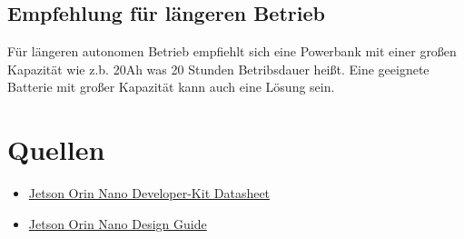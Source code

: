 \documentclass[12pt]{article}
\begin{document}
    \subsection*{Empfehlung für längeren Betrieb}
    
    Für längeren autonomen Betrieb empfiehlt sich eine Powerbank mit einer großen 
    Kapazität wie z.b. 20Ah was 20 Stunden Betribsdauer heißt.
    Eine geeignete Batterie mit großer Kapazität kann auch eine Lösung sein.

\section{Quellen}
\begin{itemize}
    \item \textcolor{blue}{\href{https://developer.download.nvidia.com/assets/embedded/secure/jetson/orin_nano/docs/Jetson-Orin-Nano-DevKit-Carrier-Board-Specification_SP-11324-001_v1.2.pdf?KmgI9RJCufnwzXmxbGPExVQp1r131wrAPSzR9RMDhh83EhjqXKmYVbjwEjUNXPMiO3peL2R_7D_xp9mFQTBkPF-Bon3l72rEZPIiNTVUv5oIjQsvFsQ0pqAZxr16W-12GNU3N596RY1rC1tgxd5_XwyvJRNhcRcOank-v-QwQweH0clhI5Vvdy5dZVF-qYLeuslCScepJxD-v-TAHS2XuNFpJb69-WoTOPi_AyxiG2scwgKnqQ==&t=eyJscyI6IndlYnNpdGUiLCJsc2QiOiJkZXZlbG9wZXIubnZpZGlhLmNvbS9lbWJlZGRlZC9kb3dubG9hZHMjP3NlYXJjaD1EYXRhJTIwU2hlZXRcdTAwMjZ0eD0kcHJvZHVjdCxqZXRzb25fYWd4X29yaW4samV0c29uX29yaW5fbngsamV0c29uX29yaW5fbmFubyJ9}{Jetson Orin Nano Developer-Kit Datasheet}}
    \item \textcolor{blue}{\href{https://developer.download.nvidia.com/assets/embedded/secure/jetson/orin_nx/docs/Jetson_Orin_NX_Series_and_Orin_Nano_Series_Design_Guide_DG-10931-001_v0.99.pdf?-ui8gdVNlYdmaR5WwGz-6xSE6JTrbPKmmiEaqjr9WzfO6o67G4dBKQu1cLXoFzsc2V3V4YrEuGoG5PmGBTp4DMwUibOm-PJI1TdO2lRc9sRcgO2NXf9KLdLphKAuH52nKmnexBGeYp2NIY0mCgF5LX7VctB_s_CeaxlaY_7BUog4ox6tD_iH2ZcG210QVnzdAVQuxdxAKdzFfO5YgnjsWnhPKu6q1_8wzr7B6rrkjGc2l6kfw5vPjg==&t=eyJscyI6IndlYnNpdGUiLCJsc2QiOiJkZXZlbG9wZXIubnZpZGlhLmNvbS9lbWJlZGRlZC9kb3dubG9hZHMjP3NlYXJjaD1EYXRhJTIwU2hlZXRcdTAwMjZ0eD0kcHJvZHVjdCxqZXRzb25fYWd4X29yaW4samV0c29uX29yaW5fbngsamV0c29uX29yaW5fbmFubyJ9}{Jetson Orin Nano Design Guide}}
\end{itemize}
\end{document}
